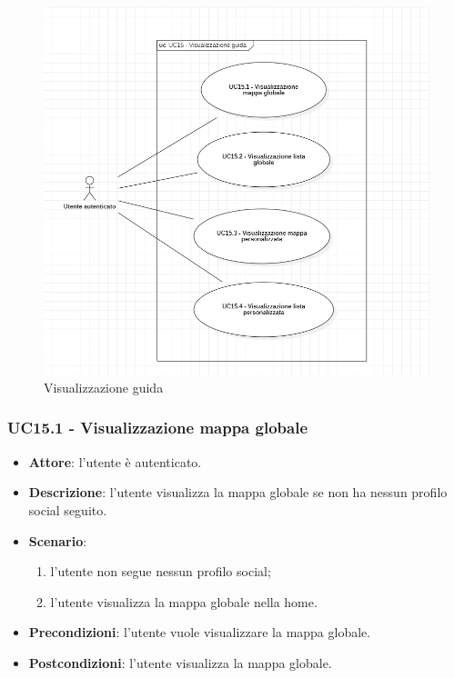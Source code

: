 \begin{figure}[H]
    \includegraphics[width=13cm]{sezioni/Images/UC15_s.png}
    \centering
    \caption{Visualizzazione guida}
\end{figure}

\subsubsection{UC15.1 - Visualizzazione mappa globale}
\begin{itemize}
    \item \textbf{Attore}: l'utente è autenticato.
    \item \textbf{Descrizione}: l'utente visualizza la mappa globale se non ha nessun profilo social seguito.
    \item \textbf{Scenario}:
    \begin{enumerate}
        \item l'utente non segue nessun profilo social;
        \item l'utente visualizza la mappa globale nella home.
    \end{enumerate}

    \item \textbf{Precondizioni}: l'utente vuole visualizzare la mappa globale.
    \item \textbf{Postcondizioni}: l'utente visualizza la mappa globale.
\end{itemize}

